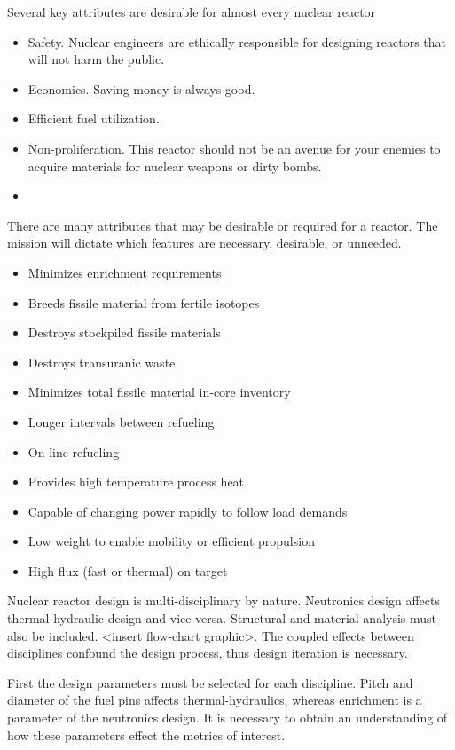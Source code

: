 \documentclass[]{article}
\begin{document}
Several key attributes are desirable for almost every nuclear reactor
\begin{itemize}
  \item Safety. Nuclear engineers are ethically responsible for designing reactors that will not harm the public.
  \item Economics. Saving money is always good.
  \item Efficient fuel utilization. 
  \item Non-proliferation. This reactor should not be an avenue for your enemies to acquire materials for nuclear weapons or dirty bombs.
  \item
\end{itemize}
There are many attributes that may be desirable or required for a reactor. The mission will dictate which features are necessary, desirable, or unneeded.
\begin{itemize}
  \item Minimizes enrichment requirements
  \item Breeds fissile material from fertile isotopes
  \item Destroys stockpiled fissile materials
  \item Destroys transuranic waste
  \item Minimizes total fissile material in-core inventory
  \item Longer intervals between refueling
  \item On-line refueling
  \item Provides high temperature process heat
  \item Capable of changing power rapidly to follow load demands
  \item Low weight to enable mobility or efficient propulsion
  \item High flux (fast or thermal) on target
\end{itemize}

Nuclear reactor design is multi-disciplinary by nature. Neutronics design affects thermal-hydraulic design and vice versa. Structural and material analysis must also be included. <insert flow-chart graphic>. The coupled effects between disciplines confound the design process, thus design iteration is necessary.

First the design parameters must be selected for each discipline. Pitch and diameter of the fuel pins affects thermal-hydraulics, whereas enrichment is a parameter of the neutronics design. It is necessary to obtain an understanding of how these parameters effect the metrics of interest. 
\end{document}

